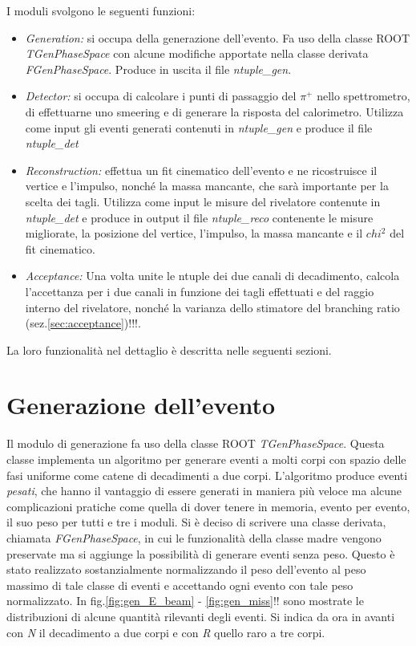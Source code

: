 \documentclass[8pt]{extarticle}
\begin{document}
I moduli svolgono le seguenti funzioni: \\
\begin{itemize}
\item \textit{Generation:} si occupa della generazione dell'evento. Fa uso della classe ROOT \textit{TGenPhaseSpace} con alcune modifiche apportate nella classe derivata \textit{FGenPhaseSpace}. Produce in uscita il file \textit{ntuple\_gen}.\\
\item \textit{Detector:} si occupa di calcolare i punti di passaggio del $\pi^+$ nello spettrometro, di effettuarne uno smeering e di generare la risposta del calorimetro. Utilizza come input gli eventi generati contenuti in \textit{ntuple\_gen} e produce il file \textit{ntuple\_det}\\
\item \textit{Reconstruction:} effettua un fit cinematico dell'evento e ne ricostruisce il vertice e l'impulso, nonché la massa mancante, che sarà importante per la scelta dei tagli. Utilizza come input le misure del rivelatore contenute in \textit{ntuple\_det} e produce in output il file \textit{ntuple\_reco} contenente le misure migliorate, la posizione del vertice, l'impulso, la massa mancante e il $chi^2$ del fit cinematico.\\
\item \textit{Acceptance:} Una volta unite le ntuple dei due canali di decadimento, calcola l'accettanza per i due canali in funzione dei tagli effettuati e del raggio interno del rivelatore, nonché la varianza dello stimatore del branching ratio (sez.\ref{sec:acceptance})!!!.
\end{itemize}

La loro funzionalità nel dettaglio è descritta nelle seguenti sezioni.

\section{Generazione dell'evento} \label{sec:generation}
Il modulo di generazione fa uso della classe ROOT \textit{TGenPhaseSpace}. Questa classe implementa un algoritmo per generare eventi a molti corpi con spazio delle fasi uniforme come catene di decadimenti a due corpi. L'algoritmo produce eventi \textit{pesati}, che hanno il vantaggio di essere generati in maniera più veloce ma alcune complicazioni pratiche come quella di dover tenere in memoria, evento per evento, il suo peso per tutti e tre i moduli. Si è deciso di scrivere una classe derivata, chiamata \textit{FGenPhaseSpace}, in cui le funzionalità della classe madre vengono preservate ma si aggiunge la possibilità di generare eventi senza peso. Questo è stato realizzato sostanzialmente normalizzando il peso dell'evento al peso massimo di tale classe di eventi e accettando ogni evento con tale peso normalizzato. In fig.\ref{fig:gen_E_beam} - \ref{fig:gen_miss}!! sono mostrate le distribuzioni di alcune quantità rilevanti degli eventi. Si indica da ora in avanti con \textit{N} il decadimento a due corpi e con \textit{R} quello raro a tre corpi. 
\end{document}

